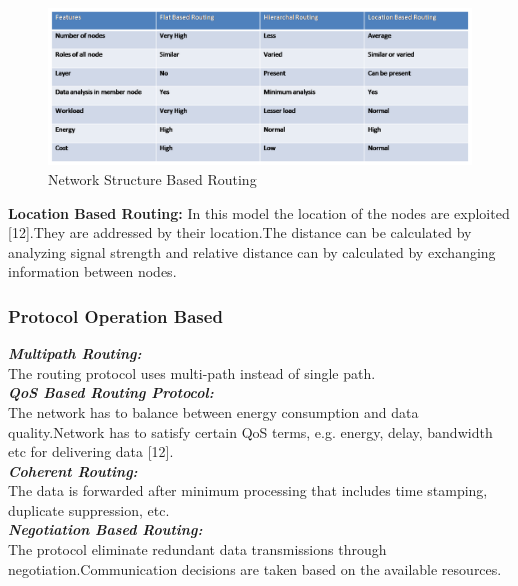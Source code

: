 \documentclass {report}
\begin{document}
\begin{figure}%
\begin{center}
\includegraphics [scale=0.5]{table1}
\caption{Network Structure Based Routing}
\end{center}
\end{figure}

{\bfseries Location Based Routing:}
In this model the location of the nodes are exploited [12].They are addressed by their location.The distance can be calculated by analyzing signal strength and relative distance can by calculated by exchanging information between nodes.\\

\subsubsection{Protocol Operation Based}
\emph{{\bfseries Multipath  Routing:\\}}
The routing protocol uses multi-path instead of single path.\\
\emph{{\bfseries QoS Based  Routing  Protocol:\\}}
The network  has to balance  between energy consumption and data quality.Network has to satisfy certain QoS terms, e.g. energy,  delay, bandwidth etc  for  delivering  data [12].\\
\emph{{\bfseries Coherent Routing:\\}}
The data is forwarded after minimum processing that includes time  stamping, duplicate  suppression,  etc.\\
\emph{{\bfseries Negotiation Based Routing:\\}}
The protocol eliminate redundant data transmissions through negotiation.Communication decisions are taken based on the available resources.\\
\end{document}
